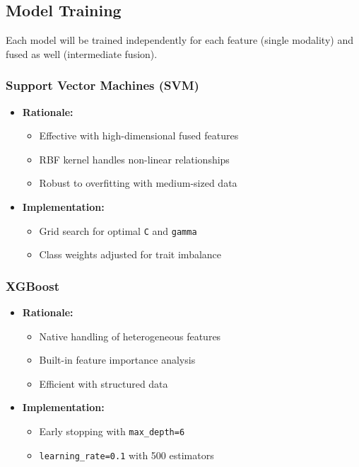 \subsection{Model Training}
\label{subsec:models}
Each model will be trained independently for each feature (single modality) and fused as well (intermediate fusion).

\subsubsection{Support Vector Machines (SVM)}
\label{subsubsec:svm}

\begin{itemize}
	\item \textbf{Rationale:}
	\begin{itemize}
		\item Effective with high-dimensional fused features \cite{farnadi2018}
		\item RBF kernel handles non-linear relationships
		\item Robust to overfitting with medium-sized data
	\end{itemize}
	
	\item \textbf{Implementation:}
	\begin{itemize}
		\item Grid search for optimal \texttt{C} and \texttt{gamma}
		\item Class weights adjusted for trait imbalance
	\end{itemize}
\end{itemize}

\subsubsection{XGBoost}
\label{subsubsec:xgboost}

\begin{itemize}
	\item \textbf{Rationale:}
	\begin{itemize}
		\item Native handling of heterogeneous features \cite{chen2016}
		\item Built-in feature importance analysis
		\item Efficient with structured data
	\end{itemize}
	
	\item \textbf{Implementation:}
	\begin{itemize}
		\item Early stopping with \texttt{max\_depth=6}
		\item \texttt{learning\_rate=0.1} with 500 estimators
	\end{itemize}
\end{itemize}


